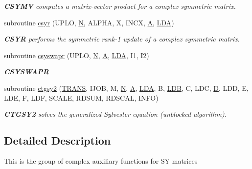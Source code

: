 \begin{DoxyCompactItemize}
\begin{DoxyCompactList}\small\item\em {\bfseries C\+S\+Y\+M\+V} computes a matrix-\/vector product for a complex symmetric matrix. \end{DoxyCompactList}\item 
subroutine \hyperlink{group__complexSYauxiliary_gab7fbaf7c4477110907f682b250b24abe}{csyr} (U\+P\+L\+O, \hyperlink{polmisc_8c_a0240ac851181b84ac374872dc5434ee4}{N}, A\+L\+P\+H\+A, X, I\+N\+C\+X, \hyperlink{classA}{A}, \hyperlink{example__user_8c_ae946da542ce0db94dced19b2ecefd1aa}{L\+D\+A})
\begin{DoxyCompactList}\small\item\em {\bfseries C\+S\+Y\+R} performs the symmetric rank-\/1 update of a complex symmetric matrix. \end{DoxyCompactList}\item 
subroutine \hyperlink{group__complexSYauxiliary_ga9f9a3d10086d7de0fcb0a4732c2e9b21}{csyswapr} (U\+P\+L\+O, \hyperlink{polmisc_8c_a0240ac851181b84ac374872dc5434ee4}{N}, \hyperlink{classA}{A}, \hyperlink{example__user_8c_ae946da542ce0db94dced19b2ecefd1aa}{L\+D\+A}, I1, I2)
\begin{DoxyCompactList}\small\item\em {\bfseries C\+S\+Y\+S\+W\+A\+P\+R} \end{DoxyCompactList}\item 
subroutine \hyperlink{group__complexSYauxiliary_ga82a880920a428b8ac1203547b0e74d6b}{ctgsy2} (\hyperlink{superlu__enum__consts_8h_a0c4e17b2d5cea33f9991ccc6a6678d62a1f61e3015bfe0f0c2c3fda4c5a0cdf58}{T\+R\+A\+N\+S}, I\+J\+O\+B, M, \hyperlink{polmisc_8c_a0240ac851181b84ac374872dc5434ee4}{N}, \hyperlink{classA}{A}, \hyperlink{example__user_8c_ae946da542ce0db94dced19b2ecefd1aa}{L\+D\+A}, B, \hyperlink{example__user_8c_a50e90a7104df172b5a89a06c47fcca04}{L\+D\+B}, C, L\+D\+C, \hyperlink{odrpack_8h_a7dae6ea403d00f3687f24a874e67d139}{D}, L\+D\+D, E, L\+D\+E, F, L\+D\+F, S\+C\+A\+L\+E, R\+D\+S\+U\+M, R\+D\+S\+C\+A\+L, I\+N\+F\+O)
\begin{DoxyCompactList}\small\item\em {\bfseries C\+T\+G\+S\+Y2} solves the generalized Sylvester equation (unblocked algorithm). \end{DoxyCompactList}\end{DoxyCompactItemize}


\subsection{Detailed Description}
This is the group of complex auxiliary functions for S\+Y matrices 

